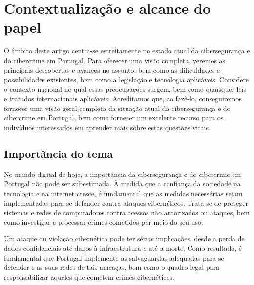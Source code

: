\section{Contextualização e alcance do papel}

O âmbito deste artigo centra-se estreitamente no estado atual da cibersegurança e do cibercrime em Portugal. Para oferecer uma visão completa, veremos as principais descobertas e avanços no assunto, bem como as dificuldades e possibilidades existentes, bem como a legislação e tecnologia aplicáveis. Considere o contexto nacional no qual essas preocupações surgem, bem como quaisquer leis e tratados internacionais aplicáveis. Acreditamos que, ao fazê-lo, conseguiremos fornecer uma visão geral completa da situação atual da cibersegurança e do cibercrime em Portugal, bem como fornecer um excelente recurso para os indivíduos interessados em aprender mais sobre estas questões vitais.


\subsection{Importância do tema}

No mundo digital de hoje, a importância da cibersegurança e do cibercrime em Portugal não pode ser subestimada. À medida que a confiança da sociedade na tecnologia e na internet cresce, é fundamental que as medidas necessárias sejam implementadas para se defender contra-ataques cibernéticos. Trata-se de proteger sistemas e redes de computadores contra acessos não autorizados ou ataques, bem como investigar e processar crimes cometidos por meio do seu uso.

Um ataque ou violação cibernética pode ter sérias implicações, desde a perda de dados confidenciais até danos à infraestrutura e até a morte. Como resultado, é fundamental que Portugal implemente as salvaguardas adequadas para se defender e as suas redes de tais ameaças, bem como o quadro legal para responsabilizar aqueles que cometem crimes cibernéticos.
